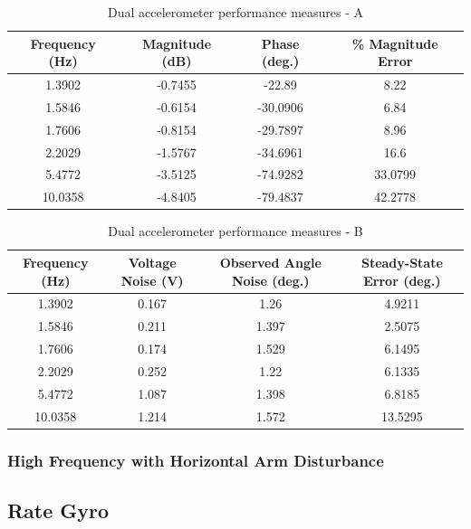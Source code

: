 \documentclass{article}
\theoremstyle{plain}
\theoremstyle{definition}
\theoremstyle{remark}
\begin{document}
\begin{table}
\begin{center}
    \begin{tabular}{|c|c|c|c|}
        \hline
        Frequency (Hz)  & Magnitude (dB) & Phase (deg.) & \% Magnitude Error \\ \hline
	1.3902  & -0.7455  & -22.89 & 8.22\\
       1.5846  & -0.6154  & -30.0906 & 6.84\\
	1.7606  & -0.8154 & -29.7897 & 8.96  \\
	2.2029 & -1.5767  & -34.6961 & 16.6   \\
	5.4772 & -3.5125  & -74.9282 & 33.0799  \\
	10.0358 & -4.8405 & -79.4837 & 42.2778 \\
        \hline
    \end{tabular}
\caption{Dual accelerometer performance measures - A}  
\label{dual_tableA}
\end{center}
\end{table}

\begin{table}
\begin{center}
    \begin{tabular}{|c|c|c|c|}
        \hline
        Frequency (Hz)  & Voltage Noise (V) & Observed Angle Noise (deg.) & Steady-State Error (deg.) \\ \hline
	1.3902  & 0.167  & 1.26 & 4.9211\\
       1.5846  & 0.211  & 1.397 & 2.5075 \\
	1.7606  & 0.174 & 1.529 & 6.1495  \\
	2.2029 & 0.252  & 1.22 & 6.1335   \\
	5.4772 & 1.087  & 1.398 & 6.8185  \\
	10.0358 & 1.214 & 1.572 & 13.5295 \\
        \hline
    \end{tabular}
\caption{Dual accelerometer performance measures - B}  
\label{dual_tableB}
\end{center}
\end{table}

\subsubsection{High Frequency with Horizontal Arm Disturbance}

\clearpage
\subsection{Rate Gyro}
\end{document}
